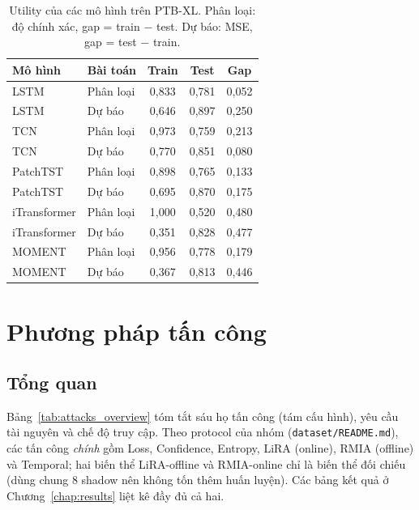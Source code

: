 \documentclass[12pt,a4paper]{report}
\begin{document}
\begin{table}[H]
\centering
\caption{Utility của các mô hình trên PTB-XL. Phân loại: độ chính xác, gap = train $-$ test. Dự báo: MSE, gap = test $-$ train.}
\label{tab:utility}
\begin{tabular}{llccc}
\toprule
\textbf{Mô hình} & \textbf{Bài toán} & \textbf{Train} & \textbf{Test} & \textbf{Gap} \\
\midrule
LSTM         & Phân loại & 0,833 & 0,781 & 0,052 \\
LSTM         & Dự báo    & 0,646 & 0,897 & 0,250 \\
TCN          & Phân loại & 0,973 & 0,759 & 0,213 \\
TCN          & Dự báo    & 0,770 & 0,851 & 0,080 \\
PatchTST     & Phân loại & 0,898 & 0,765 & 0,133 \\
PatchTST     & Dự báo    & 0,695 & 0,870 & 0,175 \\
iTransformer & Phân loại & 1,000 & 0,520 & 0,480 \\
iTransformer & Dự báo    & 0,351 & 0,828 & 0,477 \\
MOMENT       & Phân loại & 0,956 & 0,778 & 0,179 \\
MOMENT       & Dự báo    & 0,367 & 0,813 & 0,446 \\
\bottomrule
\end{tabular}
\end{table}

\chapter{Phương pháp tấn công}
\label{chap:attacks}

\section{Tổng quan}

Bảng~\ref{tab:attacks_overview} tóm tắt sáu họ tấn công (tám cấu hình), yêu cầu tài nguyên và chế độ truy cập. Theo protocol của nhóm (\texttt{dataset/README.md}), các tấn công \textit{chính} gồm Loss, Confidence, Entropy, LiRA (online), RMIA (offline) và Temporal; hai biến thể LiRA-offline và RMIA-online chỉ là biến thể đối chiếu (dùng chung 8 shadow nên không tốn thêm huấn luyện). Các bảng kết quả ở Chương~\ref{chap:results} liệt kê đầy đủ cả hai.
\end{document}
